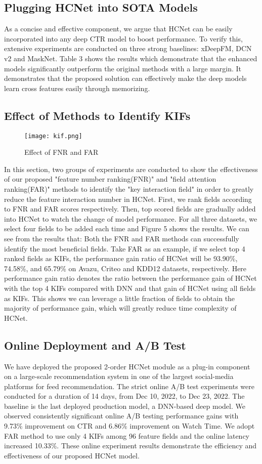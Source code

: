 \documentclass[sigconf,authorversion]{acmart}
\begin{document}
\subsection{Plugging HCNet into SOTA Models}
As a concise and effective component, we argue that HCNet can be easily incorporated into any deep CTR model to boost performance. To verify this, extensive experiments are conducted on three strong baselines: xDeepFM, DCN v2 and MaskNet. Table 3 shows the results which demonstrate that the enhanced models significantly outperform the original methods with a large margin. It demonstrates that the proposed solution can effectively make the deep models learn cross features easily through memorizing. 


\subsection{Effect of Methods to Identify KIFs}
\begin{figure}[h]
  \centering
  \texttt{[image: kif.png]}
  \caption{Effect of FNR and FAR}
  \Description{}
\end{figure}
In this section, two groups of experiments are conducted to show the effectiveness of our proposed "feature number ranking(FNR)" and "field attention ranking(FAR)" methods to identify the "key interaction field" in order to greatly reduce the feature interaction number in HCNet. First, we rank fields according to FNR and FAR scores respectively. Then, top scored fields are gradually added into HCNet to watch the change of model performance. For all three datasets, we select four fields to be added each time and Figure 5 shows the results. We can see from the results that: Both the FNR and FAR methods can successfully identify the most beneficial fields. Take FAR as an example, if we select top 4 ranked fields as KIFs, the performance gain ratio of HCNet will be 93.90\%, 74.58\%, and 65.79\% on Avazu, Criteo and KDD12 datasets, respectively. Here performance gain ratio denotes the ratio between the performance gain of HCNet with the top 4 KIFs compared with DNN and that gain of HCNet using all fields as KIFs. This shows we can leverage a little fraction of fields to obtain the majority of performance gain, which will greatly reduce time complexity of HCNet.

\subsection{Online Deployment and A/B Test}
We have deployed the proposed 2-order HCNet module as a plug-in component on a large-scale recommendation system in one of the largest social-media platforms for feed recommendation. The strict online A/B test experiments were conducted for a duration of 14 days, from Dec 10, 2022, to Dec 23, 2022. The baseline is the last deployed production model, a DNN-based deep model. We observed consistently significant online A/B testing performance gains with 9.73\% improvement on CTR and 6.86\% improvement on Watch Time. We adopt FAR method to use only 4 KIFs among 96 feature fields and the online latency increased 10.33\%. These online experiment results demonstrate the efficiency and effectiveness of our proposed HCNet model.
\end{document}
